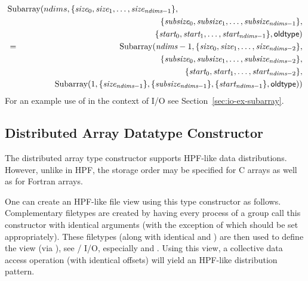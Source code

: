 \begin{eqnarray}
& & \nonumber \\
\lefteqn{\mbox{Subarray}( ndims,
\{\mword{size}_0, \mword{size}_1,\ldots,\mword{size}_{\msword{ndims}-1}\},} \label{eq:subarray-c}         \\
& & \quad\{\mword{subsize}_0, \mword{subsize}_1,\ldots,\mword{subsize}_{\msword{ndims}-1}\}, \nonumber \\
& & \quad\{\mword{start}_0, \mword{start}_1,\ldots,\mword{start}_{\msword{ndims}-1}\},\mpiarg{oldtype} )
\nonumber  \\
& = & \mbox{Subarray}(\mword{ndims}-1,\{\mword{size}_0, \mword{size}_1,\ldots,\mword{size}_{\msword{ndims}-2}\},
\nonumber \\
& &\quad\{\mword{subsize}_0, \mword{subsize}_1,\ldots,\mword{subsize}_{\msword{ndims}-2}\}, \nonumber \\
& &\quad\{\mword{start}_0, \mword{start}_1,\ldots,\mword{start}_{\msword{ndims}-2}\}, \nonumber \\
& & \hspace{.5in}\mbox{Subarray}(1,\{\mword{size}_{\msword{ndims}-1}\},\{\mword{subsize}_{\msword{ndims}-1}\},
        \{\mword{start}_{\msword{ndims}-1}\},\mpiarg{oldtype})) \nonumber
\end{eqnarray}
For an example use of  in the
context of I/O see Section~\ref{sec:io-ex-subarray}.

\subsection{Distributed Array Datatype Constructor}
\label{sec:io-const-darray}

The distributed array type constructor supports
HPF-like \cite{hpf-handbook} data distributions.
However, unlike in HPF, the storage order may be specified for C arrays
as well as for Fortran arrays.

\begin{users}
One can create an HPF-like file view using this type constructor
as follows.
Complementary filetypes are created by having every process of a group
call this constructor with identical arguments
(with the exception of  which should be set appropriately).
These filetypes (along with identical  and )
are then used to define the view (via ),
see \MPI/ I/O, especially 
and .
Using this view,
a collective data access operation (with identical offsets)
will yield an HPF-like distribution pattern.
\end{users}

